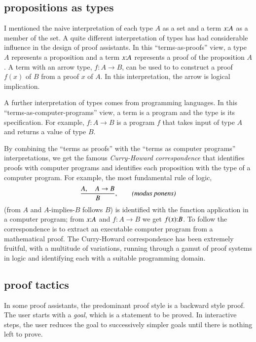 \documentclass{llncs}
\def\tc{\hbox{:}}
\begin{document}
\subsection{propositions as types}

I mentioned the naive interpretation of each type $A$ as a set and a
term $x\tc A$ as a member of the set.  A quite different
interpretation of types has had considerable influence in the design
of proof assistants.  In this ``terms-as-proofs'' view, a type $A$
represents a proposition and a term $x\tc A$ represents a proof of the
proposition $A$.  A term with an arrow type, $f:A\rightarrow B$, can
be used to to construct a proof $f(x)$ of $B$ from a proof $x$ of $A$.
In this interpretation, the arrow is logical implication.

A further interpretation of types comes from programming languages.
In this ``terms-as-computer-programs'' view, a term is a program
and the type is its specification.   For example,
$f:A\rightarrow B$ is a program $f$ that takes input of type
$A$ and returns a value of type $B$.

By combining the ``terms as proofs'' with the ``terms as computer
programs'' interpretations, we get the famous {\it Curry-Howard
  correspondence} that identifies proofs with computer programs and
identifies each proposition with the type of a computer program. 
For example,  the most fundamental rule of logic,
\[
\frac{A,\quad A\rightarrow B}{B},  \qquad \text{\it(modus ponens)}
\]
(from $A$ and $A\text{-implies-}B$ follows $B$) is identified with the
function application in a computer program; from $x\tc A$ and
$f:A\rightarrow B$ we get $f(x)\tc B$.  To follow the correspondence
is to extract an executable computer program from a mathematical
proof.  The Curry-Howard correspondence has been extremely fruitful,
with a multitude of variations, running through a gamut of proof
systems in logic and identifying each with a suitable programming
domain.






\subsection{proof tactics}

In some proof assistants, the predominant proof style is a backward
style proof.  The user starts with a {\it goal}, which is a statement
to be proved. In interactive steps, the user reduces the goal to
successively simpler goals until there is nothing left to prove.
\end{document}
